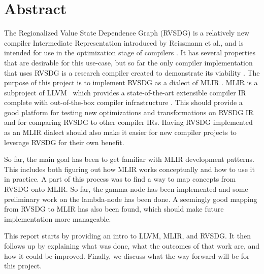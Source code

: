 \section{Abstract}
The Regionalized Value State Dependence Graph (RVSDG) is a relatively new compiler Intermediate Representation introduced by Reissmann et al., and is intended for use in the optimization stage of compilers \cite{Reissmann2018_multi-core, Reissmann2020}. It has several properties that are desirable for this use-case, but so far the only compiler implementation that uses RVSDG is a research compiler created to demonstrate its viability \cite{reissmann_github_2022}. The purpose of this project is to implement RVSDG as a dialect of MLIR \cite{mlir}. MLIR is a subproject of LLVM~\cite{llvm_homepage} which provides a state-of-the-art extensible compiler IR complete with out-of-the-box compiler infrastructure \cite{mlir}. This should provide a good platform for testing new optimizations and transformations on RVSDG IR and for comparing RVSDG to other compiler IRs. Having RVSDG implemented as an MLIR dialect should also make it easier for new compiler projects to leverage RVSDG for their own benefit.

So far, the main goal has been to get familiar with MLIR development patterns. This includes both figuring out how MLIR works conceptually and how to use it in practice. A part of this process was to find a way to map concepts from RVSDG onto MLIR. So far, the gamma-node has been implemented and some preliminary work on the lambda-node has been done. A seemingly good mapping from RVSDG to MLIR has also been found, which should make future implementation more manageable.

This report starts by providing an intro to LLVM, MLIR, and RVSDG. It then follows up by explaining what was done, what the outcomes of that work are, and how it could be improved. Finally, we discuss what the way forward will be for this project.